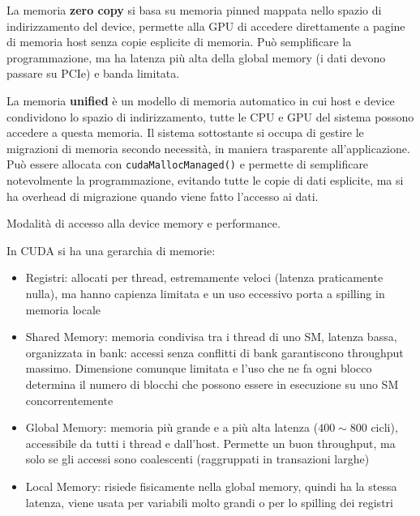 \begin{questions}
\begin{solution}
        La memoria \textbf{zero copy} si basa su memoria pinned mappata nello spazio di indirizzamento del device, permette alla GPU di accedere direttamente a pagine di memoria host senza copie esplicite di memoria. Può semplificare la programmazione, ma ha latenza più alta della global memory (i dati devono passare su PCIe) e banda limitata.
        
        La memoria \textbf{unified} è un modello di memoria automatico in cui host e device condividono lo spazio di indirizzamento, tutte le CPU e GPU del sistema possono accedere a questa memoria. Il sistema sottostante si occupa di gestire le migrazioni di memoria secondo necessità, in maniera trasparente all'applicazione. Può essere allocata con \texttt{cudaMallocManaged()} e permette di semplificare notevolmente la programmazione, evitando tutte le copie di dati esplicite, ma si ha overhead di migrazione quando viene fatto l'accesso ai dati.
    \end{solution}
    
    \question Modalità di accesso alla device memory e performance.
    
    \begin{solution}
        In CUDA si ha una gerarchia di memorie: 
        \begin{itemize}
            \item Registri: allocati per thread, estremamente veloci (latenza praticamente nulla), ma hanno capienza limitata e un uso eccessivo porta a spilling in memoria locale
            
            \item Shared Memory: memoria condivisa tra i thread di uno SM, latenza bassa, organizzata in bank: accessi senza conflitti di bank garantiscono throughput massimo. Dimensione comunque limitata e l'uso che ne fa ogni blocco determina il numero di blocchi che possono essere in esecuzione su uno SM concorrentemente
            
            \item Global Memory: memoria più grande e a più alta latenza ($400 \sim 800$ cicli), accessibile da tutti i thread e dall'host. Permette un buon throughput, ma solo se gli accessi sono coalescenti (raggruppati in transazioni larghe)
            
            \item Local Memory: risiede fisicamente nella global memory, quindi ha la stessa latenza, viene usata per variabili molto grandi o per lo spilling dei registri
            

\end{itemize}
\end{solution}
\end{questions}
